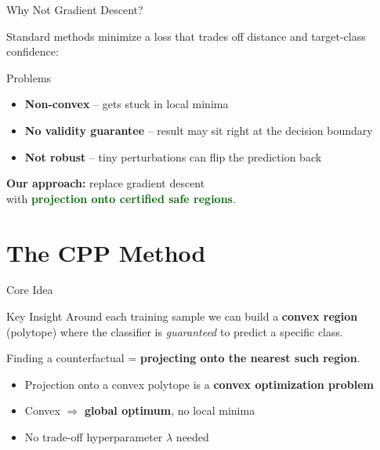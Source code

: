 \documentclass[aspectratio=169, 11pt]{beamer}
\begin{document}
\begin{frame}{Why Not Gradient Descent?}

Standard methods minimize a loss that trades off distance and target-class confidence:

\begin{alertblock}{Problems}
\begin{itemize}
  \item \textbf{Non-convex} -- gets stuck in local minima
  \item \textbf{No validity guarantee} -- result may sit right at the decision boundary
  \item \textbf{Not robust} -- tiny perturbations can flip the prediction back
\end{itemize}
\end{alertblock}

\bigskip

\begin{center}
\textbf{Our approach:} replace gradient descent\\
with \textcolor{darkgreen}{\textbf{projection onto certified safe regions}}.
\end{center}

\end{frame}

\section{The CPP Method}

\begin{frame}{Core Idea}

\begin{block}{Key Insight}
  Around each training sample we can build a \textbf{convex region} (polytope) where the classifier is \emph{guaranteed} to predict a specific class.

  \bigskip

  Finding a counterfactual = \textbf{projecting onto the nearest such region}.
\end{block}

\bigskip

\begin{itemize}
  \item Projection onto a convex polytope is a \textbf{convex optimization problem}
  \item Convex $\Rightarrow$ \textbf{global optimum}, no local minima
  \item No trade-off hyperparameter $\lambda$ needed
\end{itemize}

\end{frame}
\end{document}

